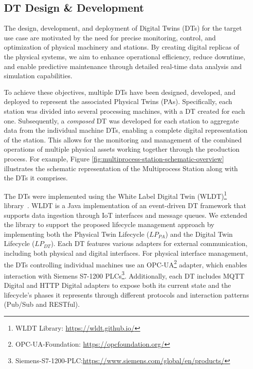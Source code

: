 \subsection{DT Design \& Development}

The design, development, and deployment of Digital Twins (DTs) for the target use case are motivated by the need for precise monitoring, control, and optimization of physical machinery and stations. By creating digital replicas of the physical systems, we aim to enhance operational efficiency, reduce downtime, and enable predictive maintenance through detailed real-time data analysis and simulation capabilities.

To achieve these objectives, multiple DTs have been designed, developed, and deployed to represent the associated Physical Twins (\ac{PA}s). Specifically, each station was divided into several processing machines, with a DT created for each one. Subsequently, a \textit{composed} DT was developed for each station to aggregate data from the individual machine DTs, enabling a complete digital representation of the station. This allows for the monitoring and management of the combined operations of multiple physical assets working together through the production process. For example, Figure \ref{fig:multiprocess-station-schematic-overview} illustrates the schematic representation of the Multiprocess Station along with the DTs it comprises.

The DTs were implemented using the White Label Digital Twin (WLDT)\footnote{WLDT Library: \url{https://wldt.github.io/}} library~\cite{wldt_picone_2021}. WLDT is a Java implementation of an event-driven DT framework that supports data ingestion through IoT interfaces and message queues. We extended the library to support the proposed lifecycle management approach by implementing both the Physical Twin Lifecycle ($LP_{PA}$) and the Digital Twin Lifecycle ($LP_{DT}$). Each DT features various adapters for external communication, including both physical and digital interfaces. For physical interface management, the DTs controlling individual machines use an OPC-UA\footnote{OPC-UA-Foundation: \url{https://opcfoundation.org/}} adapter, which enables interaction with Siemens S7-1200 PLCs\footnote{Siemens-S7-1200-PLC:\url{https://www.siemens.com/global/en/products/}}. Additionally, each DT includes MQTT\cite{mqtt} Digital and HTTP Digital adapters to expose both its current state and the lifecycle's phases it represents through different protocols and interaction patterns (Pub/Sub and RESTful).

